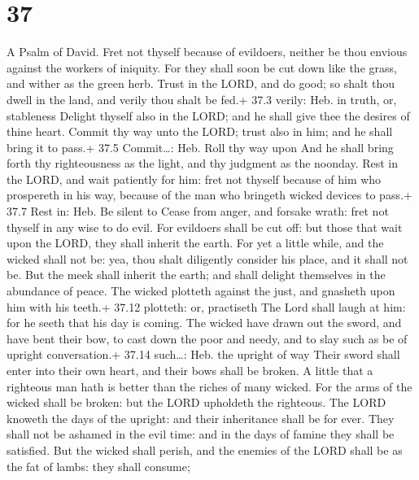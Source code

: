 \hypertarget{section-36}{%
\section{37}\label{section-36}}

A Psalm of David.  Fret not thyself because of evildoers,
neither be thou envious against the workers of iniquity. 
For they shall soon be cut down like the grass, and wither as the green
herb.  Trust in the LORD, and do good; so shalt thou dwell
in the land, and verily thou shalt be fed.+ 37.3 verily: Heb. in truth,
or, stableness  Delight thyself also in the LORD; and he
shall give thee the desires of thine heart.  Commit thy way
unto the LORD; trust also in him; and he shall bring it to pass.+ 37.5
Commit\ldots: Heb. Roll thy way upon  And he shall bring
forth thy righteousness as the light, and thy judgment as the noonday.
 Rest in the LORD, and wait patiently for him: fret not
thyself because of him who prospereth in his way, because of the man who
bringeth wicked devices to pass.+ 37.7 Rest in: Heb. Be silent to
 Cease from anger, and forsake wrath: fret not thyself in
any wise to do evil.  For evildoers shall be cut off: but
those that wait upon the LORD, they shall inherit the earth.
 For yet a little while, and the wicked shall not be: yea,
thou shalt diligently consider his place, and it shall not be.
 But the meek shall inherit the earth; and shall delight
themselves in the abundance of peace.  The wicked plotteth
against the just, and gnasheth upon him with his teeth.+ 37.12 plotteth:
or, practiseth  The Lord shall laugh at him: for he seeth
that his day is coming.  The wicked have drawn out the
sword, and have bent their bow, to cast down the poor and needy, and to
slay such as be of upright conversation.+ 37.14 such\ldots: Heb. the
upright of way  Their sword shall enter into their own
heart, and their bows shall be broken.  A little that a
righteous man hath is better than the riches of many wicked.
 For the arms of the wicked shall be broken: but the LORD
upholdeth the righteous.  The LORD knoweth the days of the
upright: and their inheritance shall be for ever.  They
shall not be ashamed in the evil time: and in the days of famine they
shall be satisfied.  But the wicked shall perish, and the
enemies of the LORD shall be as the fat of lambs: they shall consume;
